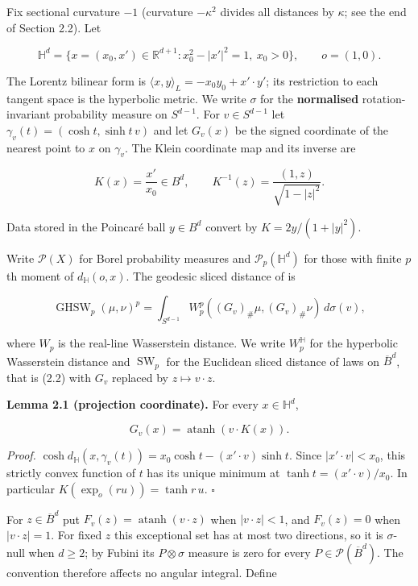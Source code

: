 \documentclass[
  british,
  11pt,
  a4paper,
]{article}
\begin{document}
Fix sectional curvature \(-1\) (curvature \(-\kappa^2\) divides all
distances by \(\kappa\); see the end of Section 2.2). Let

\[
\mathbb H^d=\{x=(x_0,x')\in\mathbb R^{d+1}:x_0^2-|x'|^2=1,\ x_0>0\},
\qquad o=(1,0).
\]

The Lorentz bilinear form is
\(\langle x,y\rangle_L=-x_0y_0+x'\cdot y'\); its restriction to each
tangent space is the hyperbolic metric. We write \(\sigma\) for the
\textbf{normalised} rotation-invariant probability measure on
\(S^{d-1}\). For \(v\in S^{d-1}\) let
\(\gamma_v(t)=(\cosh t,\sinh t\,v)\) and let \(G_v(x)\) be the signed
coordinate of the nearest point to \(x\) on \(\gamma_v\). The Klein
coordinate map and its inverse are

\[
K(x)=\frac{x'}{x_0}\in B^d,
\qquad
K^{-1}(z)=\frac{(1,z)}{\sqrt{1-|z|^2}}.
\tag{2.1}
\]

Data stored in the Poincaré ball \(y\in B^d\) convert by
\(K=2y/(1+|y|^2)\).

Write \(\mathcal P(X)\) for Borel probability measures and
\(\mathcal P_p(\mathbb H^d)\) for those with finite \(p\)th moment of
\(d_{\mathbb H}(o,x)\). The geodesic sliced distance of \citet[equations
(18) and (21)]{Bonet2023} is

\[
\operatorname{GHSW}_p(\mu,\nu)^p
=\int_{S^{d-1}}W_p^p((G_v)_\#\mu,(G_v)_\#\nu)\,d\sigma(v),
\tag{2.2}
\]

where \(W_p\) is the real-line Wasserstein distance. We write
\(W_p^{\mathbb H}\) for the hyperbolic Wasserstein distance and
\(\operatorname{SW}_p\) for the Euclidean sliced distance of laws on
\(\overline B^d\), that is (2.2) with \(G_v\) replaced by
\(z\mapsto v\cdot z\).

\textbf{Lemma 2.1 (projection coordinate).} For every
\(x\in\mathbb H^d\),

\[
G_v(x)=\operatorname{atanh}(v\cdot K(x)).
\tag{2.3}
\]

\emph{Proof.}
\(\cosh d_{\mathbb H}(x,\gamma_v(t))=x_0\cosh t-(x'\cdot v)\sinh t\).
Since \(|x'\cdot v|<x_0\), this strictly convex function of \(t\) has
its unique minimum at \(\tanh t=(x'\cdot v)/x_0\). In particular
\(K(\exp_o(ru))=\tanh r\,u\). \(\square\)

For \(z\in\overline B^d\) put \(F_v(z)=\operatorname{atanh}(v\cdot z)\)
when \(|v\cdot z|<1\), and \(F_v(z)=0\) when \(|v\cdot z|=1\). For fixed
\(z\) this exceptional set has at most two directions, so it is
\(\sigma\)-null when \(d\geq2\); by Fubini its \(P\otimes\sigma\)
measure is zero for every \(P\in\mathcal P(\overline B^d)\). The
convention therefore affects no angular integral. Define
\end{document}
